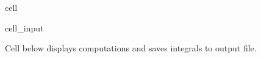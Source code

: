 \documentclass[letterpaper,10pt,english]{jupyterBook}
\begin{document}
\begin{sphinxuseclass}{cell}
\begin{sphinxVerbatimInput}
\begin{sphinxuseclass}{cell_input}
\begin{sphinxVerbatim}[commandchars=\\\{\}]
    
\end{sphinxVerbatim}

\end{sphinxuseclass}\end{sphinxVerbatimInput}

\end{sphinxuseclass}
\sphinxAtStartPar
Cell below displays computations and saves integrals to output file.
\end{document}
